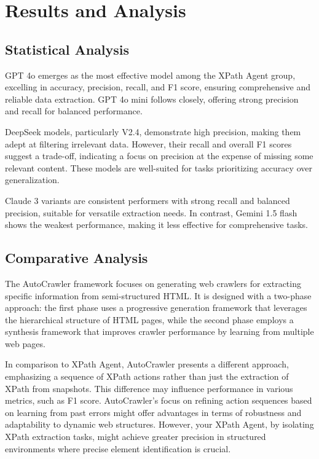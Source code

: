 \documentclass[a4paper]{article}
\begin{document}
\section{Results and Analysis}
\subsection{Statistical Analysis}

    
GPT 4o emerges as the most effective model among the XPath Agent group, excelling in accuracy, precision, recall, and F1 score, ensuring comprehensive and reliable data extraction. GPT 4o mini follows closely, offering strong precision and recall for balanced performance.

DeepSeek models, particularly V2.4, demonstrate high precision, making them adept at filtering irrelevant data. However, their recall and overall F1 scores suggest a trade-off, indicating a focus on precision at the expense of missing some relevant content. These models are well-suited for tasks prioritizing accuracy over generalization.

Claude 3 variants are consistent performers with strong recall and balanced precision, suitable for versatile extraction needs. In contrast, Gemini 1.5 flash shows the weakest performance, making it less effective for comprehensive tasks.
    

\subsection{Comparative Analysis} 
The AutoCrawler\cite{huang2024autoscraperprogressiveunderstandingweb} framework focuses on generating web crawlers for extracting specific information from semi-structured HTML. 
It is designed with a two-phase approach: the first phase uses a progressive generation framework that leverages the hierarchical 
structure of HTML pages, while the second phase employs a synthesis framework that improves crawler performance by learning from 
multiple web pages. 

In comparison to XPath Agent, AutoCrawler presents a different approach, emphasizing a sequence of XPath actions rather than just the extraction of XPath from snapshots. This difference may influence performance in various metrics, such as F1 score. 
AutoCrawler's focus on refining action sequences based on learning from past errors might offer advantages in terms of robustness 
and adaptability to dynamic web structures. However, your XPath Agent, by isolating XPath extraction tasks, might achieve greater 
precision in structured environments where precise element identification is crucial.
\end{document}
